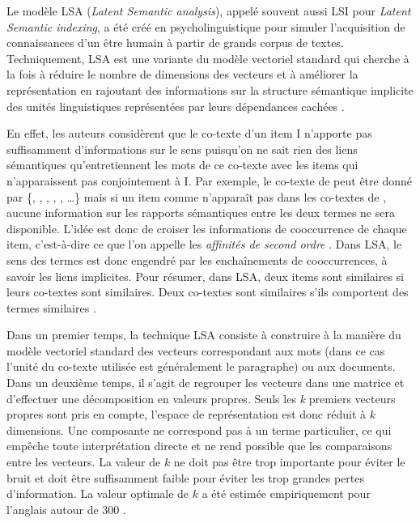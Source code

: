 Le modèle LSA (\emph{Latent Semantic analysis}), appelé souvent aussi
LSI pour \emph{Latent Semantic indexing}, a été créé en
psycholinguistique pour simuler l'acquisition de connaissances d'un
être humain à partir de grands corpus de textes. Techniquement, LSA
est une variante du modèle vectoriel standard qui cherche à la fois à
réduire le nombre de dimensions des vecteurs et à améliorer la
représentation en rajoutant des informations sur la structure
sémantique implicite des unités linguistiques représentées par leurs
dépendances cachées \cite{DeeAll1990}.

En effet, les auteurs considèrent que le co-texte d'un item I
n'apporte pas suffisamment d'informations sur le sens puisqu'on ne
sait rien des liens sémantiques qu'entretiennent les mots de ce
co-texte avec les items qui n'apparaissent pas conjointement à I. Par
exemple, le co-texte de  peut être donné par
\{, , ,
, , \ldots\} mais si un item comme
 n'apparaît pas dans les co-textes de
, aucune information sur les rapports sémantiques
entre les deux termes ne sera disponible. L'idée est donc de croiser
les informations de cooccurrence de chaque item, c'est-à-dire ce que
l'on appelle les \emph{affinités de second ordre}
\cite{Grefenstette1994}. Dans LSA, le sens des termes est donc
engendré par les enchaînements de cooccurrences, à savoir les liens
implicites.  Pour résumer, dans LSA, deux items sont similaires si
leurs co-textes sont similaires. Deux co-textes sont similaires s'ils
comportent des termes similaires \cite{Lemaire2003}.

Dans un premier temps, la technique LSA consiste à construire à la
manière du modèle vectoriel standard des vecteurs correspondant aux
mots (dans ce cas l'unité du co-texte utilisée est généralement le
paragraphe) ou aux documents. Dans un deuxième temps, il s'agit de
regrouper les vecteurs dans une matrice et d'effectuer une
décomposition en valeurs propres.  Seuls les \emph{k} premiers
vecteurs propres sont pris en compte, l'espace de représentation est
donc réduit à $k$ dimensions. Une composante ne correspond pas à un
terme particulier, ce qui empêche toute interprétation directe et ne
rend possible que les comparaisons entre les vecteurs. La valeur de
$k$ ne doit pas être trop importante pour éviter le bruit et doit être
suffisamment faible pour éviter les trop grandes pertes d'information.
La valeur optimale de $k$ a été estimée empiriquement pour l'anglais
autour de 300 \cite{DeeAll1990}.

